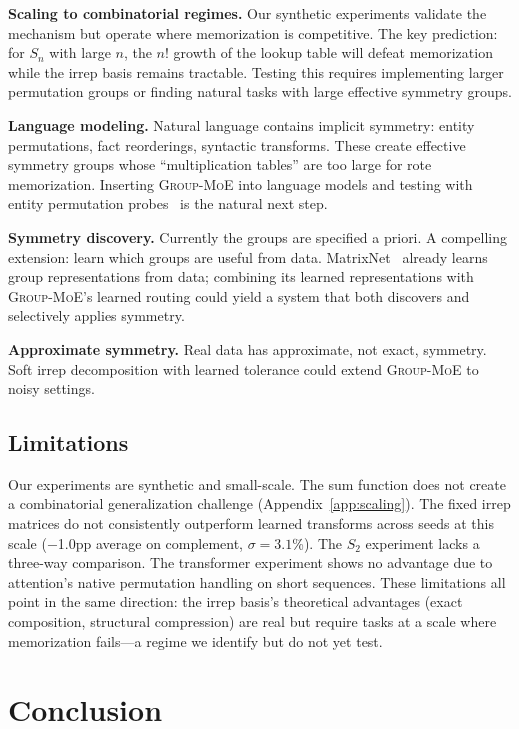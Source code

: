 \documentclass[10pt, letterpaper]{article}
\newcommand{\gmoe}{\textsc{Group-MoE}}
\begin{document}
\textbf{Scaling to combinatorial regimes.} Our synthetic experiments validate the mechanism but operate where memorization is competitive. The key prediction: for $S_n$ with large $n$, the $n!$ growth of the lookup table will defeat memorization while the irrep basis remains tractable. Testing this requires implementing larger permutation groups or finding natural tasks with large effective symmetry groups.

\textbf{Language modeling.} Natural language contains implicit symmetry: entity permutations, fact reorderings, syntactic transforms. These create effective symmetry groups whose ``multiplication tables'' are too large for rote memorization. Inserting \gmoe{} into language models and testing with entity permutation probes~\cite{walters2025ordering} is the natural next step.

\textbf{Symmetry discovery.} Currently the groups are specified a priori. A compelling extension: learn which groups are useful from data. MatrixNet~\cite{laird2024matrixnet} already learns group representations from data; combining its learned representations with \gmoe{}'s learned routing could yield a system that both discovers and selectively applies symmetry.

\textbf{Approximate symmetry.} Real data has approximate, not exact, symmetry. Soft irrep decomposition with learned tolerance could extend \gmoe{} to noisy settings.

\subsection{Limitations}

Our experiments are synthetic and small-scale. The sum function does not create a combinatorial generalization challenge (Appendix~\ref{app:scaling}). The fixed irrep matrices do not consistently outperform learned transforms across seeds at this scale ($-$1.0pp average on complement, $\sigma = 3.1$\%). The $S_2$ experiment lacks a three-way comparison. The transformer experiment shows no advantage due to attention's native permutation handling on short sequences. These limitations all point in the same direction: the irrep basis's theoretical advantages (exact composition, structural compression) are real but require tasks at a scale where memorization fails---a regime we identify but do not yet test.

\section{Conclusion}
\label{sec:conclusion}
\end{document}
